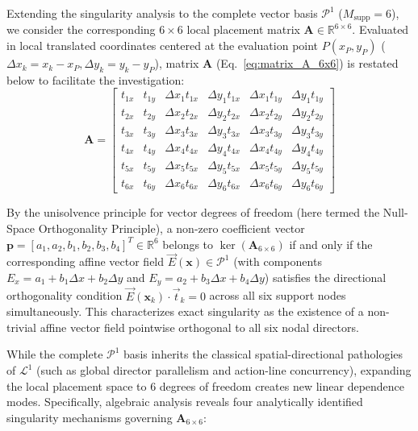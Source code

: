 \documentclass[preprint,12pt]{elsarticle}
\begin{document}
Extending the singularity analysis to the complete vector basis $\mathcal{P}^1$ ($M_{\mathrm{supp}} = 6$), we consider the corresponding $6 \times 6$ local placement matrix $\mathbf{A} \in \mathbb{R}^{6 \times 6}$. Evaluated in local translated coordinates centered at the evaluation point $P(x_P, y_P)$ ($\Delta x_k = x_k - x_P, \Delta y_k = y_k - y_P$), matrix $\mathbf{A}$ (Eq.~\eqref{eq:matrix_A_6x6}) is restated below to facilitate the investigation:
\begin{equation}
    \mathbf{A} = \begin{bmatrix}
        t_{1x} & t_{1y} & \Delta x_1 t_{1x} & \Delta y_1 t_{1x} & \Delta x_1 t_{1y} & \Delta y_1 t_{1y} \\[4pt]
        t_{2x} & t_{2y} & \Delta x_2 t_{2x} & \Delta y_2 t_{2x} & \Delta x_2 t_{2y} & \Delta y_2 t_{2y} \\[4pt]
        t_{3x} & t_{3y} & \Delta x_3 t_{3x} & \Delta y_3 t_{3x} & \Delta x_3 t_{3y} & \Delta y_3 t_{3y} \\[4pt]
        t_{4x} & t_{4y} & \Delta x_4 t_{4x} & \Delta y_4 t_{4x} & \Delta x_4 t_{4y} & \Delta y_4 t_{4y} \\[4pt]
        t_{5x} & t_{5y} & \Delta x_5 t_{5x} & \Delta y_5 t_{5x} & \Delta x_5 t_{5y} & \Delta y_5 t_{5y} \\[4pt]
        t_{6x} & t_{6y} & \Delta x_6 t_{6x} & \Delta y_6 t_{6x} & \Delta x_6 t_{6y} & \Delta y_6 t_{6y}
    \end{bmatrix}
    \label{eq:matrix_A_P1_repeated}
\end{equation}

By the unisolvence principle for vector degrees of freedom \cite{monk2003finite} (here termed the Null-Space Orthogonality Principle), a non-zero coefficient vector $\mathbf{p} = [a_1, a_2, b_1, b_2, b_3, b_4]^T \in \mathbb{R}^6$ belongs to $\ker(\mathbf{A}_{6 \times 6})$ if and only if the corresponding affine vector field $\vec{E}(\mathbf{x}) \in \mathcal{P}^1$ (with components $E_x = a_1 + b_1 \Delta x + b_2 \Delta y$ and $E_y = a_2 + b_3 \Delta x + b_4 \Delta y$) satisfies the directional orthogonality condition $\vec{E}(\mathbf{x}_k) \cdot \vec{t}_k = 0$ across all six support nodes simultaneously. This characterizes exact singularity as the existence of a non-trivial affine vector field pointwise orthogonal to all six nodal directors.

While the complete $\mathcal{P}^1$ basis inherits the classical spatial-directional pathologies of $\mathcal{L}^1$ (such as global director parallelism and action-line concurrency), expanding the local placement space to 6 degrees of freedom creates new linear dependence modes. Specifically, algebraic analysis reveals four analytically identified singularity mechanisms governing $\mathbf{A}_{6 \times 6}$:
\end{document}

